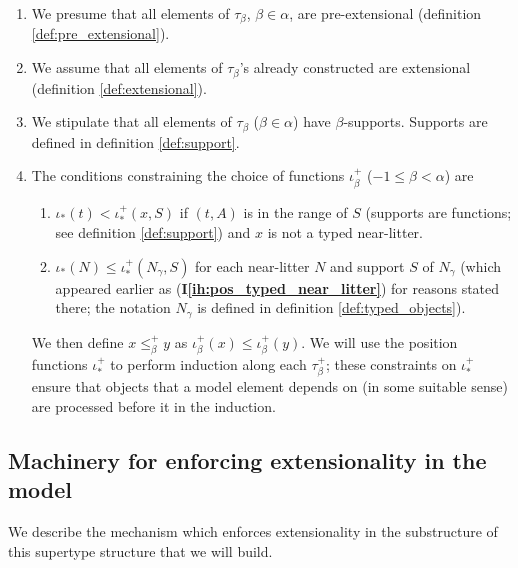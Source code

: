 \documentclass[112pt]{article}
\theoremstyle{definition}
\theoremstyle{remark}
\newcommand{\ihref}[1]{(\textbf{I\ref{#1}})}
\newcommand{\hsuggest}[1]{{\color{magenta}#1}}
\begin{document}
\begin{enumerate}
\item \label{ih:pre_extensional} We presume that all elements of $\tau_\beta$, $\beta\in \alpha$, are pre-extensional {(definition \ref{def:pre_extensional})}.   %

\item \label{ih:extensional} We assume that all elements of $\tau_\beta$'s already constructed are extensional {(definition \ref{def:extensional})}.  %

\item \label{ih:elements_have_supports} We stipulate that all elements of $\tau_\beta$ ($\beta\in\alpha$) have $\beta$-supports.  {Supports are defined in definition \ref{def:support}.}

\item \label{ih:position_constraints} The conditions constraining the choice of functions $\iota^+_\beta$ ($-1 \leq \beta < \alpha$) are

\begin{enumerate}

\item $\iota_*(t) < \iota^+_*(x,S)$ if $(t,A)$ is in the range of $S$ {(supports are functions; see definition \ref{def:support})} and $x$ is not a typed near-litter.  %

\item $\iota_*(N) \leq \iota^+_*(N_\gamma,S)$ for each near-litter $N$ and support $S$ of $N_\gamma
$ {(which appeared earlier as \ihref{ih:pos_typed_near_litter} for reasons stated there; the notation $N_\gamma$ is defined in definition \ref{def:typed_objects}).}  %

\end{enumerate}

We then define $x \leq^+_\beta y$ as $\iota^+_\beta(x) \leq \iota^+_\beta(y)$.  {We will use the position functions $\iota^+_*$ to perform induction along each $\tau_\beta^+$; these constraints on $\iota^+_*$ ensure that objects that a model element depends on (in some suitable sense) are processed before it in the induction.}

\end{enumerate}


\subsection{Machinery for enforcing extensionality in the model}\label{ss:extensionality_machinery}
  We describe the mechanism which enforces extensionality in the substructure of this supertype structure that we will build.
\end{document}

